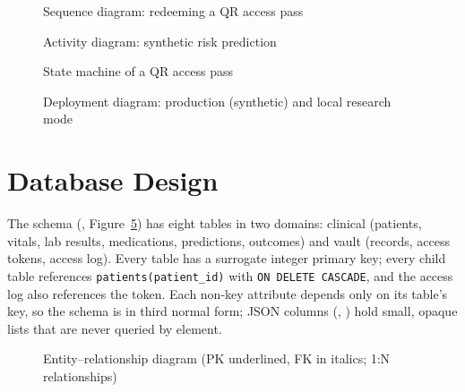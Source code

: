 \begin{figure}[!htbp]
\centering
{}
\caption{Sequence diagram: redeeming a QR access pass}
\label{fig:seq}
\end{figure}

\begin{figure}[!htbp]
\centering
{}
\caption{Activity diagram: synthetic risk prediction}
\label{fig:activity}
\end{figure}

\begin{figure}[!htbp]
\centering
{}
\caption{State machine of a QR access pass}
\label{fig:state}
\end{figure}

\begin{figure}[!htbp]
\centering
{}
\caption{Deployment diagram: production (synthetic) and local research mode}
\label{fig:deploy}
\end{figure}

\section{Database Design}
The schema (, Figure~\ref{fig:er}) has eight tables in two domains: clinical
(patients, vitals, lab results, medications, predictions, outcomes) and vault (records, access tokens,
access log). Every table has a surrogate integer primary key; every child table references
\texttt{patients(patient\_id)} with \texttt{ON DELETE CASCADE}, and the access log also references the token.
Each non-key attribute depends only on its table's key, so the schema is in third normal form; JSON
columns (, ) hold small, opaque lists that are never queried
by element.

\begin{figure}[!htbp]
\centering
{}
\caption{Entity--relationship diagram (PK underlined, FK in italics; 1:N relationships)}
\label{fig:er}
\end{figure}

